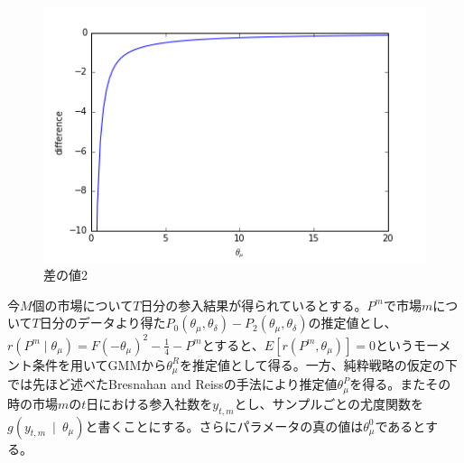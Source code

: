 \documentclass{jsarticle}
\begin{document}
\begin{figure}[htbp]
\centering
\includegraphics{diff2.png}
\caption{差の値2}
\end{figure}

今$M$個の市場について$T$日分の参入結果が得られているとする。$P^m$で市場$m$について$T$日分のデータより得た$P_0(\theta_{\mu}, \theta_{\delta}) - P_2(\theta_{\mu}, \theta_{\delta})$の推定値とし、$r(P^m\mid \theta_{\mu}) = F(-\theta_{\mu})^2 -\frac{1}{4} - P^m$とすると、$E\left[ r(P^m, \theta_{\mu}) \right] = 0$というモーメント条件を用いてGMMから$\theta_{\mu}^R$を推定値として得る。一方、純粋戦略の仮定の下では先ほど述べたBresnahan and Reissの手法により推定値$\theta_{\mu}^P$を得る。またその時の市場$m$の$t$日における参入社数を$y_{t,m}$とし、サンプルごとの尤度関数を$g(y_{t,m}\ \mid\ \theta_{\mu})$と書くことにする。さらにパラメータの真の値は$\theta_{\mu}^0$であるとする。
\end{document}

